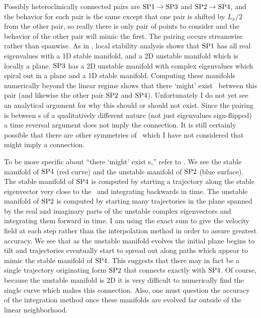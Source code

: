 Possibly heteroclinically connected pairs are ${{\text{SP1}}} \to {\ensuremath{{\text{SP3}}}}$
 and ${{\text{SP2}}} \to {\ensuremath{{\text{SP4}}}}$, and the behavior for each pair is the same except
 that one pair is shifted by $L_x/2$ from the other pair, so really
 there is only pair of points to consider and the behavior of the
 other pair will mimic the first. The pairing occurs streamwise
 rather than spanwise.  As in ,
 local stability analysis shows that ${{\text{SP1}}}$ has all real eigenvalues
with a 1D stable manifold,
and a 2D unstable manifold which is locally a plane. ${{\text{SP3}}}$
 has a 2D unstable manifold with complex eigenvalues which spiral
 out in a plane and a 1D stable manifold. Computing these manifolds
 numerically beyond the linear regime shows that there `might' exist
 \hec\ between this pair (and likewise the
 other pair ${{\text{SP2}}}$ and ${{\text{SP4}}}$). Unfortunately I do not yet see an
 analytical argument for why this should or should not exist. Since
 the pairing is between \stagp s of a qualitatively different nature
 (not just eigenvalues sign-flipped) a time
 reversal argument does not imply the connection. It is still certainly
 possible that there are other symmetries of \pCf\ which I have not
 considered that might imply a connection.

 To be more specific about ``there `might' exist \hec s,''
 refer to . We see the
 stable manifold of ${{\text{SP4}}}$ (red curve) and the unstable manifold of
 ${{\text{SP2}}}$ (blue surface). The stable manifold of ${{\text{SP4}}}$ is computed by
 starting a trajectory along the stable eigenvector very close to the
 \stagp\ and integrating backwards in time.
 The unstable manifold of ${{\text{SP2}}}$ is computed by starting many
 trajectories in the plane spanned by the real and imaginary parts
 of the unstable complex eigenvectors and integrating them forward in
 time. I am using the exact sum to give the velocity field at each
 step rather than the interpolation method in order to assure
 greatest accuracy. We see that as the unstable
 manifold evolves the initial plane begins to tilt and trajectories eventually
 start to spread out along paths which appear to mimic the stable
 manifold of ${{\text{SP4}}}$. This suggests that there may in fact be a single
 trajectory originating form ${{\text{SP2}}}$ that connects exactly with ${{\text{SP4}}}$.
 Of course, because the unstable manifold is 2D it is very difficult
  to numerically find the single curve which makes this connection.
  Also, one must question the accuracy of the integration method
  once these manifolds are evolved far outside of the linear
  neighborhood.

